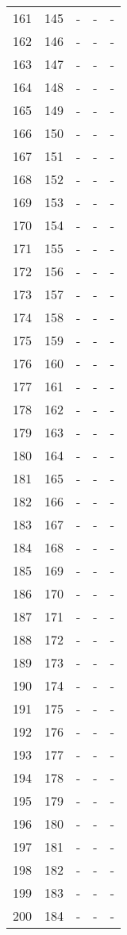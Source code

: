 \documentclass[10pt]{article}
\begin{document}
\begin {longtable}{l r r r r}
161 & 145 & - & - & - \\
162 & 146 & - & - & - \\
163 & 147 & - & - & - \\
164 & 148 & - & - & - \\
165 & 149 & - & - & - \\
166 & 150 & - & - & - \\
167 & 151 & - & - & - \\
168 & 152 & - & - & - \\
169 & 153 & - & - & - \\
170 & 154 & - & - & - \\
171 & 155 & - & - & - \\
172 & 156 & - & - & - \\
173 & 157 & - & - & - \\
174 & 158 & - & - & - \\
175 & 159 & - & - & - \\
176 & 160 & - & - & - \\
177 & 161 & - & - & - \\
178 & 162 & - & - & - \\
179 & 163 & - & - & - \\
180 & 164 & - & - & - \\
181 & 165 & - & - & - \\
182 & 166 & - & - & - \\
183 & 167 & - & - & - \\
184 & 168 & - & - & - \\
185 & 169 & - & - & - \\
186 & 170 & - & - & - \\
187 & 171 & - & - & - \\
188 & 172 & - & - & - \\
189 & 173 & - & - & - \\
190 & 174 & - & - & - \\
191 & 175 & - & - & - \\
192 & 176 & - & - & - \\
193 & 177 & - & - & - \\
194 & 178 & - & - & - \\
195 & 179 & - & - & - \\
196 & 180 & - & - & - \\
197 & 181 & - & - & - \\
198 & 182 & - & - & - \\
199 & 183 & - & - & - \\
200 & 184 & - & - & - \\

\end{longtable}
\end{document}
